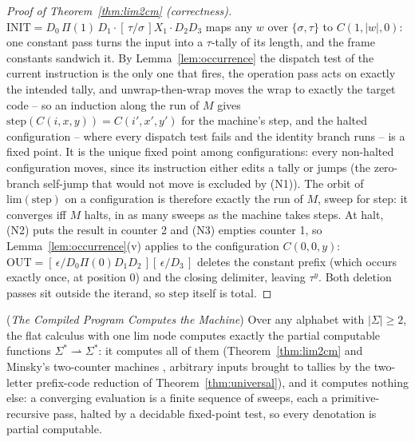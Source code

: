 \documentclass[runningheads,envcountsect]{llncs}
\begin{document}
\begin{proof}[Proof of Theorem~\ref{thm:lim2cm} (correctness)]
    $\mathrm{INIT} = D_0\,\Pi(1)\,D_1\cdot[\,\tau/\sigma\,]X_1\cdot D_2 D_3$
    maps any $w$ over $\{\sigma, \tau\}$ to $C(1, |w|, 0)$: one constant
    pass turns the input into a $\tau$-tally of its length, and the
    frame constants sandwich it. By Lemma~\ref{lem:occurrence} the
    dispatch test of the current instruction is the only one that
    fires, the operation pass acts on exactly the intended tally, and
    unwrap-then-wrap moves the wrap to exactly the target code -- so an
    induction along the run of $M$ gives
    $\mathrm{step}(C(i, x, y)) = C(i', x', y')$ for the machine's step,
    and the halted configuration -- where every dispatch test fails and
    the identity branch runs -- is a fixed point. It is the unique
    fixed point among configurations: every non-halted configuration
    moves, since its instruction either edits a tally or jumps (the
    zero-branch self-jump that would not move is excluded by (N1)).
    The orbit of $\mathrm{lim}(\mathrm{step})$ on a configuration is
    therefore exactly the run of $M$, sweep for step: it converges iff
    $M$ halts, in as many sweeps as the machine takes steps. At halt,
    (N2) puts the result in counter 2 and (N3) empties counter 1, so
    Lemma~\ref{lem:occurrence}(v) applies to the configuration
    $C(0, 0, y)$: $\mathrm{OUT} =
    [\,\epsilon/D_0\Pi(0)D_1D_2\,][\,\epsilon/D_3\,]$ deletes the
    constant prefix (which occurs exactly once, at position $0$) and
    the closing delimiter, leaving $\tau^{y}$. Both deletion passes sit
    outside the iterand, so $\mathrm{step}$ itself is total.
\end{proof}

\begin{theorem}
    (\emph{The Compiled Program Computes the Machine})
    \label{thm:limpartial}
    Over any alphabet with $|\Sigma| \geq 2$, the flat calculus with one
    $\mathrm{lim}$ node computes exactly the partial computable
    functions $\Sigma^* \rightharpoonup \Sigma^*$: it computes all of
    them (Theorem~\ref{thm:lim2cm} and Minsky's two-counter machines
    \cite{minsky67}, arbitrary inputs brought to tallies by the
    two-letter prefix-code reduction of Theorem~\ref{thm:universal}),
    and it computes nothing else: a converging evaluation is a finite
    sequence of sweeps, each a primitive-recursive pass, halted by a
    decidable fixed-point test, so every denotation is partial
    computable.
\end{theorem}
\end{document}

